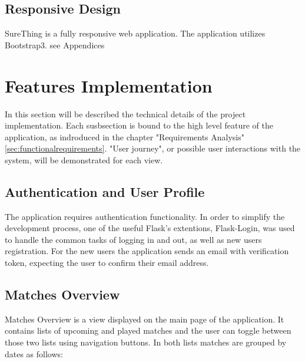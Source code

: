 \subsection{Responsive Design}
SureThing is a fully responsive web application. The application utilizes Bootstrap3. 
see Appendices


\section{Features Implementation}
In this section will be described the technical details of the project implementation. Each susbsection is bound to the high level feature of the application, as indroduced in the chapter "Requirements Analysis" \ref{sec:functionalrequirements}. "User journey", or possible user interactions with the system, will be demonstrated for each view.

\subsection{Authentication and User Profile}

The application requires authentication functionality. In order to simplify the development process, one of the useful Flask's extentions, Flask-Login, was used to handle the common tasks of logging in and out, as well as new users registration. For the new users the application sends an email with verification token, expecting the user to confirm their email address. 

\subsection{Matches Overview}
Matches Overview is a view displayed on the main page of the application. It contains lists of upcoming and played matches and the user can toggle between those two lists using navigation buttons. In both lists matches are grouped by dates as follows:

